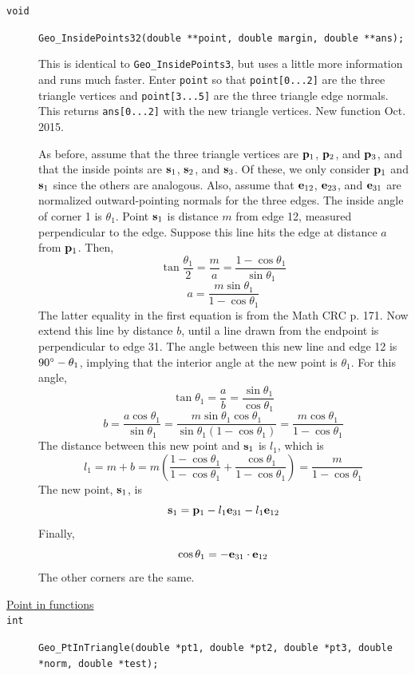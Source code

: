 \documentclass[11pt]{article}
\newcommand {\ttt} {\texttt}
\begin{document}
\begin{description}
\item[\ttt{void}]
\ttt{Geo\_InsidePoints32(double **point, double margin, double **ans);}

This is identical to \ttt{Geo\_InsidePoints3}, but uses a little more information and runs much faster. Enter \ttt{point} so that \ttt{point[0...2]} are the three triangle vertices and \ttt{point[3...5]} are the three triangle edge normals. This returns \ttt{ans[0...2]} with the new triangle vertices. New function Oct. 2015.

As before, assume that the three triangle vertices are $\vb{p}_1$, $\vb{p}_2$, and $\vb{p}_3$, and that the inside points are $\vb{s}_1$, $\vb{s}_2$, and $\vb{s}_3$. Of these, we only consider $\vb{p}_1$ and $\vb{s}_1$ since the others are analogous. Also, assume that $\vb{e}_{12}$, $\vb{e}_{23}$, and $\vb{e}_{31}$ are normalized outward-pointing normals for the three edges. The inside angle of corner 1 is $\theta_1$. Point $\vb{s}_1$ is distance $m$ from edge 12, measured perpendicular to the edge. Suppose this line hits the edge at distance $a$ from $\vb{p}_1$. Then,
$$\tan \frac{\theta_1}{2} = \frac{m}{a} = \frac{1-\cos \theta_1}{\sin \theta_1}$$
$$a=\frac{m \sin \theta_1}{1-\cos \theta_1}$$
The latter equality in the first equation is from the Math CRC p. 171. Now extend this line by distance $b$, until a line drawn from the endpoint is perpendicular to edge 31. The angle between this new line and edge 12 is $90\degree-\theta_1$, implying that the interior angle at the new point is $\theta_1$. For this angle,
$$\tan \theta_1 = \frac{a}{b} = \frac{\sin \theta_1}{\cos \theta_1}$$
$$b = \frac{a \cos \theta_1}{\sin \theta_1} = \frac{m \sin \theta_1 \cos \theta_1}{\sin \theta_1(1-\cos \theta_1)} = \frac{m \cos \theta_1}{1-\cos \theta_1}$$
The distance between this new point and $\vb{s}_1$ is $l_1$, which is
$$l_1 = m+b = m\left(\frac{1- \cos \theta_1}{1-\cos \theta_1}+\frac{\cos \theta_1}{1-\cos \theta_1} \right) = \frac{m}{1-\cos \theta_1}$$
The new point, $\vb{s}_1$, is
$$\vb{s}_1 = \vb{p}_1 - l_1\vb{e}_{31} - l_1\vb{e}_{12}$$
Finally,
$$\cos \theta_1 = - \vb{e}_{31} \cdot \vb{e}_{12}$$
The other corners are the same.

\item[\underline{Point in functions}]

\item[\ttt{int}]
\ttt{Geo\_PtInTriangle(double *pt1, double *pt2, double *pt3, double *norm, double *test);}


\end{description}
\end{document}
